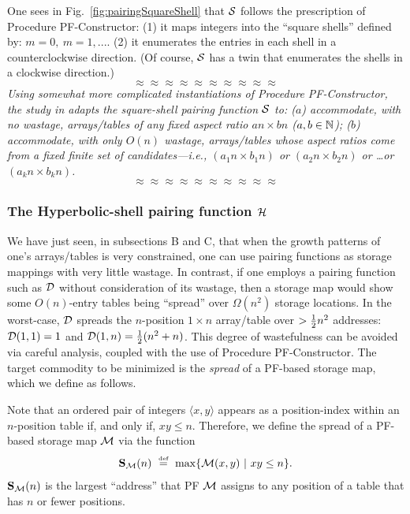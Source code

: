 One sees in Fig.~\ref{fig:pairingSquareShell} that $\mbox{$\cal S$}$ follows the
prescription of Procedure PF-Constructor: (1) it maps integers into
the ``square shells'' defined by: $m = 0, \ m = 1, ...$.  (2) it
enumerates the entries in each shell in a counterclockwise direction.
(Of course, $\mbox{$\cal S$}$ has a twin that enumerates the shells in a clockwise
direction.)
\[ \approx \approx \approx \approx \approx \approx \approx \approx \approx \approx \]
{\em Using somewhat more complicated instantiations of Procedure
  PF-Constructor, the study in \cite{Rosenberg75} adapts the
  square-shell pairing function $\mbox{$\cal S$}$ to: ($a$) accommodate, with no
  wastage, arrays/tables of any fixed aspect ratio $an \times bn$
  ($a,b \in \mathbb{N}$); ($b$) accommodate, with only $O(n)$ wastage,
  arrays/tables whose aspect ratios come from a fixed finite set of
  candidates---i.e., $(a_1 n \times b_1 n)$ or $(a_2 n \times b_2 n)$
  or \ldots or $(a_k n \times b_k n)$.}
\[ \approx \approx \approx \approx \approx \approx \approx \approx \approx \approx \]

\subsubsection{The Hyperbolic-shell pairing function $\mbox{$\cal H$}$}
\label{sec:hyp-shell-pair-fn}

We have just seen, in subsections B and C, that when the growth
patterns of one's arrays/tables is very constrained, one can use
pairing functions as storage mappings with very little wastage.  In
contrast, if one employs a pairing function such as $\mbox{$\cal D$}$ without
consideration of its wastage, then a storage map would show some
$O(n)$-entry tables being ``spread'' over $\Omega(n^2)$ storage
locations.  In the worst-case, $\mbox{$\cal D$}$ spreads the $n$-position $1 \times
n$ array/table over $> {1 \over 2} n^2$ addresses: $\mbox{$\cal D$}(1,1) = 1$ and
$\mbox{$\cal D$}(1,n) = {1 \over 2} (n^2 + n)$.  This degree of wastefulness can be
avoided via careful analysis, coupled with the use of Procedure
PF-Constructor.  The target commodity to be minimized is the {\it
  spread} of a PF-based storage map, which we define as follows.

Note that an ordered pair of integers $\langle x,y \rangle$ appears as
a position-index within an $n$-position table if, and only if, $xy
\leq n$.  Therefore, we define the spread of a PF-based storage map
$\mbox{$\cal M$}$ via the function
\begin{equation}
\label{e.compact}
{\bf S}_{\cal M}(n) \ \stackrel{\mbox{{\tiny def}}}{=} \ \max\{ \mbox{$\cal M$}(x, y) \ | \ xy \leq n \}.
\end{equation}
${\bf S}_{\cal M}(n)$ is the largest ``address'' that PF $\mbox{$\cal M$}$ assigns
to any position of a table that has $n$ or fewer positions.

